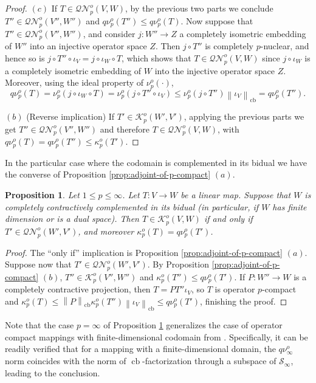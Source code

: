 \documentclass[11pt]{amsart}
\DeclareMathOperator{\cb}{cb}
\newcommand{\n}[1]{ \left\|#1\right\| }
\newtheorem{proposition}[theorem]{Proposition}
\numberwithin{equation}{section}
\begin{document}
\begin{proof}
$(c)$ If $T \in \mathcal{QN}^o_p(V,W)$, by the previous two parts we conclude $T'' \in \mathcal{QN}^o_p(V'',W'')$ and $q\nu_p^o(T'') \le q\nu_p^o(T)$.
Now suppose that $T'' \in \mathcal{QN}^o_p(V'',W'')$, and consider $j : W'' \to Z$ a completely isometric embedding of $W''$ into an injective operator space $Z$. Then $j \circ T''$ is completely $p$-nuclear, and hence so is $j \circ T'' \circ \iota_V = j \circ \iota_W \circ T$, which shows that $T \in \mathcal{QN}^o_p(V,W)$ since $j \circ \iota_W$ is a completely isometric embedding of $W$ into the injective operator space $Z$. Moreover, using the ideal property of $\nu_p^o(\cdot)$, 
\[
q\nu_p^o(T) =  \nu_p^o(j \circ \iota_W \circ T) = \nu_p^o(j \circ T'' \circ \iota_V) \le \nu_p^o(j \circ T'' ) \n{\iota_V}_{\cb} = q\nu_p^o(T'').
\]


$(b)$ (Reverse implication) If $T' \in \mathcal{K}^o_p(W',V')$, applying the previous parts we get $T'' \in \mathcal{QN}^o_p(V'',W'')$ and therefore $T \in \mathcal{QN}^o_p(V,W)$, with $q\nu_p^o(T) = q\nu_p^o(T'') \le \kappa_p^o(T')$.
\end{proof}



In the particular case where the codomain is complemented in its bidual we have the converse of Proposition \ref{prop:adjoint-of-p-compact} $(a)$.

\begin{proposition}\label{prop:adjoint-of-p-compact-finite-dimension}
Let $1 \le p \le \infty$.
Let $T : V \to W$ be a linear map.
Suppose that $W$ is completely contractively complemented in its bidual (in particular, if $W$ has finite dimension or is a dual space).
Then $T \in \mathcal{K}^o_p(V,W)$ if and only if $T' \in \mathcal{QN}^o_p(W',V')$, and moreover $\kappa^o_p(T) = q\nu^o_p(T')$.
\end{proposition}

\begin{proof}
The ``only if'' implication is Proposition \ref{prop:adjoint-of-p-compact} $(a)$. Suppose now that  $T' \in \mathcal{QN}^o_p(W',V')$. By Proposition \ref{prop:adjoint-of-p-compact} $(b)$, $T'' \in \mathcal{K}^o_p(V'',W'')$ and $\kappa_p^o(T'') \le  q\nu^o_p(T')$.
If $P : W'' \to W$ is a completely contractive projection, then $T = PT''\iota_V$, so $T$ is operator $p$-compact and 
$\kappa_p^o(T) \le \n{P}_{\cb} \kappa_p^o(T'') \n{\iota_V}_{\cb} \le  q\nu^o_p(T')$, finishing the proof.
\end{proof}


Note that the case $p=\infty$ of Proposition \ref{prop:adjoint-of-p-compact-finite-dimension} generalizes the case of operator compact mappings with finite-dimensional codomain from \cite[Cor. 4.15]{Oikhberg-Thesis}. Specifically, it can be readily verified that for a mapping with a finite-dimensional domain, the $q\nu_\infty^o$ norm coincides with the norm of $\cb$-factorization through a subspace of $\mathcal{S}_\infty$, leading to the conclusion.
\end{document}
